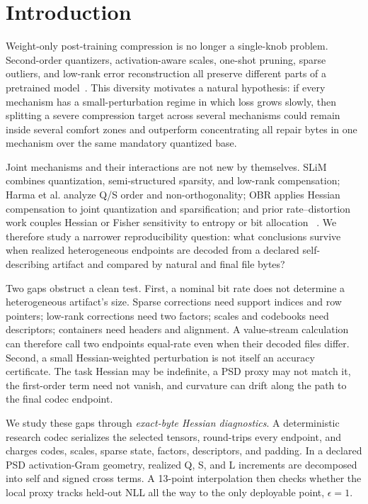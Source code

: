 \section{Introduction}
\label{sec:introduction}

Weight-only post-training compression is no longer a single-knob problem.
Second-order quantizers, activation-aware scales, one-shot pruning, sparse
outliers, and low-rank error reconstruction all preserve different parts of a
pretrained model~\citep{frantar2023gptq,frantar2023sparsegpt,lin2024awq,dettmers2024spqr,zhang2024lqer}.
This diversity motivates a natural hypothesis: if every mechanism has a
small-perturbation regime in which loss grows slowly, then splitting a severe
compression target across several mechanisms could remain inside several
comfort zones and outperform concentrating all repair bytes in one mechanism
over the same mandatory quantized base.

Joint mechanisms and their interactions are not new by themselves.  SLiM
combines quantization, semi-structured sparsity, and low-rank compensation;
Harma et al. analyze Q/S order and non-orthogonality; OBR applies Hessian
compensation to joint quantization and sparsification; and prior rate--distortion
work couples Hessian or Fisher sensitivity to entropy or bit allocation
~\citep{mozaffari2025slim,harma2025effective,guo2026optimal,choi2017towards,orr2025optimal,young2025radio}.
We therefore study a narrower reproducibility question: what conclusions
survive when realized heterogeneous endpoints are decoded from a declared
self-describing artifact and compared by natural and final file bytes?

Two gaps obstruct a clean test.  First, a nominal bit rate does not determine a
heterogeneous artifact's size.  Sparse corrections need support indices and row
pointers; low-rank corrections need two factors; scales and codebooks need
descriptors; containers need headers and alignment.  A value-stream calculation
can therefore call two endpoints equal-rate even when their decoded files
differ.  Second, a small Hessian-weighted perturbation is not itself an
accuracy certificate.  The task Hessian may be indefinite, a PSD proxy may not
match it, the first-order term need not vanish, and curvature can drift along
the path to the final codec endpoint.

We study these gaps through \emph{exact-byte Hessian diagnostics}.  A
deterministic research codec serializes the selected tensors, round-trips every
endpoint, and charges codes, scales, sparse state, factors, descriptors, and
padding.  In a declared PSD activation-Gram geometry, realized Q, S, and L
increments are decomposed into self and signed cross terms.  A 13-point
interpolation then checks whether the local proxy tracks held-out NLL all the
way to the only deployable point, $\epsilon=1$.


